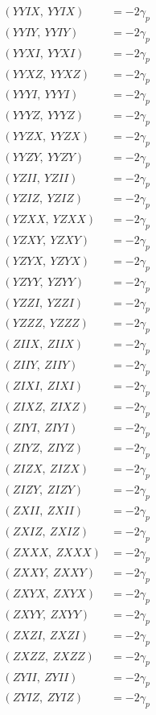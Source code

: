 \documentclass{article}
\begin{document}
\begin{align*}
  (YYIX,\ YYIX) &= - 2 \gamma_{p} \\
  (YYIY,\ YYIY) &= - 2 \gamma_{p} \\
  (YYXI,\ YYXI) &= - 2 \gamma_{p} \\
  (YYXZ,\ YYXZ) &= - 2 \gamma_{p} \\
  (YYYI,\ YYYI) &= - 2 \gamma_{p} \\
  (YYYZ,\ YYYZ) &= - 2 \gamma_{p} \\
  (YYZX,\ YYZX) &= - 2 \gamma_{p} \\
  (YYZY,\ YYZY) &= - 2 \gamma_{p} \\
  (YZII,\ YZII) &= - 2 \gamma_{p} \\
  (YZIZ,\ YZIZ) &= - 2 \gamma_{p} \\
  (YZXX,\ YZXX) &= - 2 \gamma_{p} \\
  (YZXY,\ YZXY) &= - 2 \gamma_{p} \\
  (YZYX,\ YZYX) &= - 2 \gamma_{p} \\
  (YZYY,\ YZYY) &= - 2 \gamma_{p} \\
  (YZZI,\ YZZI) &= - 2 \gamma_{p} \\
  (YZZZ,\ YZZZ) &= - 2 \gamma_{p} \\
  (ZIIX,\ ZIIX) &= - 2 \gamma_{p} \\
  (ZIIY,\ ZIIY) &= - 2 \gamma_{p} \\
  (ZIXI,\ ZIXI) &= - 2 \gamma_{p} \\
  (ZIXZ,\ ZIXZ) &= - 2 \gamma_{p} \\
  (ZIYI,\ ZIYI) &= - 2 \gamma_{p} \\
  (ZIYZ,\ ZIYZ) &= - 2 \gamma_{p} \\
  (ZIZX,\ ZIZX) &= - 2 \gamma_{p} \\
  (ZIZY,\ ZIZY) &= - 2 \gamma_{p} \\
  (ZXII,\ ZXII) &= - 2 \gamma_{p} \\
  (ZXIZ,\ ZXIZ) &= - 2 \gamma_{p} \\
  (ZXXX,\ ZXXX) &= - 2 \gamma_{p} \\
  (ZXXY,\ ZXXY) &= - 2 \gamma_{p} \\
  (ZXYX,\ ZXYX) &= - 2 \gamma_{p} \\
  (ZXYY,\ ZXYY) &= - 2 \gamma_{p} \\
  (ZXZI,\ ZXZI) &= - 2 \gamma_{p} \\
  (ZXZZ,\ ZXZZ) &= - 2 \gamma_{p} \\
  (ZYII,\ ZYII) &= - 2 \gamma_{p} \\
  (ZYIZ,\ ZYIZ) &= - 2 \gamma_{p} \\

\end{align*}
\end{document}
